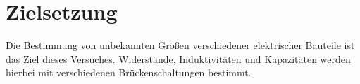 \section{Zielsetzung}
\label{sec:Ziel}
Die Bestimmung von unbekannten Größen verschiedener elektrischer Bauteile ist
das Ziel dieses Versuches. Widerstände, Induktivitäten und Kapazitäten werden
hierbei mit verschiedenen Brückenschaltungen bestimmt.
